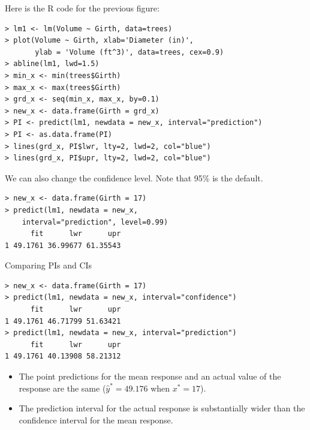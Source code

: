 \documentclass[10pt]{beamer}
\begin{document}
\begin{frame}[fragile]
Here is the R code for the previous figure:
\small
\begin{verbatim}
> lm1 <- lm(Volume ~ Girth, data=trees)
> plot(Volume ~ Girth, xlab='Diameter (in)', 
       ylab = 'Volume (ft^3)', data=trees, cex=0.9)
> abline(lm1, lwd=1.5)
> min_x <- min(trees$Girth)
> max_x <- max(trees$Girth)
> grd_x <- seq(min_x, max_x, by=0.1)
> new_x <- data.frame(Girth = grd_x)
> PI <- predict(lm1, newdata = new_x, interval="prediction")
> PI <- as.data.frame(PI)
> lines(grd_x, PI$lwr, lty=2, lwd=2, col="blue")
> lines(grd_x, PI$upr, lty=2, lwd=2, col="blue")
\end{verbatim}
\end{frame}

\begin{frame}[fragile]
We can also change the confidence level.  Note that 95\% is the default.\\
\vspace{10pt}

\begin{verbatim}
> new_x <- data.frame(Girth = 17)
> predict(lm1, newdata = new_x, 
    interval="prediction", level=0.99)
      fit      lwr      upr
1 49.1761 36.99677 61.35543
\end{verbatim}

\end{frame}

\begin{frame}[fragile]{Comparing PIs and CIs}
\begin{verbatim}
> new_x <- data.frame(Girth = 17)
> predict(lm1, newdata = new_x, interval="confidence")
      fit      lwr      upr
1 49.1761 46.71799 51.63421
> predict(lm1, newdata = new_x, interval="prediction")
      fit      lwr      upr
1 49.1761 40.13908 58.21312
\end{verbatim}

\begin{itemize}
\item The point predictions for the mean response and an actual value of the response are the same ($\hat{y}^* = 49.176$ when $x^*=17$).
\item The prediction interval for the actual response is substantially wider than the confidence interval for the mean response.
\end{itemize}
\end{frame}
\end{document}
